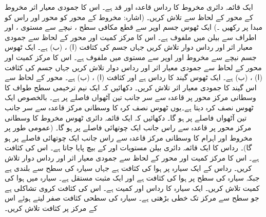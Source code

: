 ایک قائمہ دائری مخروط کا رداس قاعدہ  اور قد  ہے۔ اس کا جمودی معیار اثر مخروط کے محور کے لحاظ سے تلاش کریں۔ (اشارہ: مخروط کے محور کو محور  اور راس کو مبدا پر رکھیں ۔)
ایک ٹھوس جسم اوپر سے قطع مکافی سطح ، نیچے سے مستوی ،  اور اطراف سے بیلن  میں ملفوف ہے۔ اس کا مرکز کمیت اور محور  کے لحاظ سے جمودی معیار اثر اور رداس دوار تلاش کریں جہاں جسم کی کثافت  (ا) ، (ب)  ہے۔
ایک ٹھوس جسم نیچے سے مخروط  اور اوپر سے مستوی   میں ملفوف ہے۔ اس کا مرکز کمیت اور محور  کے لحاظ سے جمودی معیار اثر اور رداس دوار تلاش کریں  جہاں جسم کی کثافت (ا) ، (ب)  ہے۔
ایک ٹھوس گیند کا رداس  ہے اور  کثافت (ا) ، (ب)  ہے۔ محور  کے لحاظ سے اس گیند کا جمودی معیار اثر تلاش کریں۔
دکھائیں کہ ایک نیم  ترخیمی سطح طواف   کا وسطانی مرکز محور  پر  قاعدہ سے  سر جانب  تین آٹھواں فاصلے پر ہے۔ بالخصوص  ایک  ٹھوس نصف کرہ دیتا ہے۔یوں ٹھوس نصف کرہ کا وسطانی مرکز قاعدہ سے سر جانب تین آٹھواں فاصلے پر ہو گا۔
دکھائیں کہ ایک قائمہ دائری  ٹھوس مخروط کا وسطانی مرکز محور پر قاعدہ سے راس جانب ایک  چوتھائی فاصلے  پر ہو گا۔ (عمومی طور پر مخروط اور  اہرام کا وسطانی مرکز قاعدہ سے راس جانب ایک چوتھائی فاصلے  پر ہو گا)۔
رداس  کا ایک قائمہ دائری بیلن  مستویات  اور  کے بیچ پایا جاتا ہے۔ اس کی کثافت  ہے۔ اس کا مرکز کمیت اور محور  کے لحاظ سے جمودی معیار اثر اور رداس دوار تلاش کریں۔
 رداس  کے ایک سیارہ پر  ہوا کی کثافت  ہے جہاں سیارہ کی سطح سے بلندی   ہے جبکہ سیارہ کی سطح پر ہوا کی کثافت  ہے اور  ایک مثبت  مستقل ہے۔ سیارہ میں ہوا کی کمیت تلاش کریں۔
ایک سیارہ کا رداس  اور کمیت  ہے۔ اس کی کثافت کروی تشاکلی ہے جو  سطح سے مرکز تک خطی بڑھتی ہے۔ سیارہ کی سطحی کثافت صفر لیتے ہوئے  اس  کے مرکز پر کثافت تلاش کریں۔
